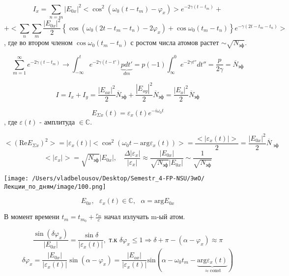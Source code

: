 \documentclass[12pt, a4paper]{report}
\begin{document}
\[ I_x = \sum_{n =m } |E_{0x}  | ^2 <\cos  ^2 (\omega_0 (t -t_m ) - \varphi_x )> e^{-2 \gamma (t -t_m )} +   \] 
\[ + \bigg< \sum_{n}\sum_{m} \frac{ |E_{0x } | ^2 }{2 }\left\{ \cos (\omega_0 (2t - t_m -t_n ) - 2 \varphi_x) + \cos \omega_0 (t_m - t_n) \right\} e^{-\gamma (2t - t_m - t_n)}\bigg> \] 
, где во втором членом \(\cos \omega_0 (t_m - t_n)   \) с ростом числа атомов растет \( \sim \sqrt{N_{\text{эф} } } \).

\[ \sum_{m =1}^{\infty  }e^{- 2 \gamma (t - t_m )} \to  \int_{- \infty  }^{t } e^{-2 \gamma (t - t' ) }  \underbrace{p dt '}_{dm } = p (- 1 ) \int_{\infty }^{0} e^{- 2\gamma t''     } dt '' = \frac{p }{2\gamma } = \overline{N }_{\text{эф} }         \] 

\[ I = I_x + I_y     = \frac{|E_{ox }  | ^2 }{2}\overline{N }_{\text{эф} } +\frac{|E_{oy }  | ^2 }{2} \overline{N }_{\text{эф} } = \frac{|E_{o }  | ^2 }{2} \overline{N }_{\text{эф} } \] 

\[ E_{\Sigma x } (t ) = \varepsilon_x(t ) e^{ - i \omega_0 t }   \] 
, где \( \varepsilon(t ) \) - амплитуда \( \in \mathbb{C} \).

\[ <(\mathrm{Re }  E_{\Sigma x }      ) ^2 > = |\varepsilon_{x} (t)|<\cos  ^2 (\omega_0 t - \mathrm{arg }  \varepsilon _x (t ) )> = \frac{ <|\varepsilon_x (t)|>}{2 } = \frac{|E_{0x} | ^2 }{2} \overline{N } _{\text{ эф} }   \] 
\[ <|\varepsilon_x |> = \sqrt{N_{\text{эф} } } |E_{0x } | , \quad  \frac{ \Delta |\varepsilon_{x} |}{|\varepsilon_x|} \approx \frac{|E_{0x} |}{\sqrt{N_{\text{эф} } }|E_{0x} |}  \sim \frac{1}{\sqrt{N_{\text{эф} } }}  \] 

\begin{center}
    \texttt{[image: /Users/vladbelousov/Desktop/Semestr\_4-FP-NSU/ЭиО/Лекции\_по\_дням/image/100.png]}
\end{center} 
\[ E_{0x}, \text{ }  \varepsilon_x (t ) \in \mathbb{C}  , \text{ } \alpha  = \mathrm{arg }  E_{0x}    \] 

В момент времени \( t_m = t_{m_0} + \frac{ r_m }{c}   \) начал излучать m-ый атом.

\[ \frac{\sin (\delta \varphi_x ) }{|E_{0x} |} =\frac{\sin \delta}{|\varepsilon_x(t)|}, \text{ т.к } \delta \varphi_x \le 1 \Rightarrow \delta + \pi - (\alpha - \varphi_x ) \approx \pi    \] 
\[ \delta \varphi_x = \frac{ |E_{0x} |}{|\varepsilon_x(t)|} \sin (\alpha - \varphi_x ) = \frac{|E_{ox } |}{|\varepsilon_x(t     )|} \mathrm{ sin }    (\alpha - \omega_0 t_m - \underbrace{\mathrm{arg } \varepsilon_{x } (t )}_{\approx \mathrm{const}  }  )   \] 
\end{document}
